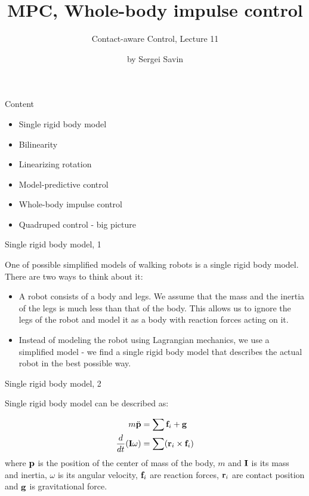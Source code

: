 \documentclass{beamer}
\title{MPC, Whole-body impulse control}
\subtitle{Contact-aware Control, Lecture 11}
\author{by Sergei Savin}
\date{\mydate}
\begin{document}
\maketitle


\begin{frame}{Content}

\begin{itemize}
\item Single rigid body model
\item Bilinearity
\item Linearizing rotation
\item Model-predictive control
\item Whole-body impulse control
\item Quadruped control - big picture
\end{itemize}

\end{frame}




\begin{frame}{Single rigid body model, 1}
	\begin{flushleft}
		
		One of possible simplified models of walking robots is a single rigid body model. There are two ways to think about it:
		
		\begin{itemize}
			\item A robot consists of a body and legs. We assume that the mass and the inertia of the legs is much less than that of the body. This allows us to ignore the legs of the robot and model it as a body with reaction forces acting on it.
			
			\item Instead of modeling the robot using Lagrangian mechanics, we use a simplified model - we find a single rigid body model that describes the actual robot in the best possible way.
		\end{itemize}
		
	\end{flushleft}
\end{frame}



\begin{frame}{Single rigid body model, 2}
	\begin{flushleft}
		
		Single rigid body model can be described as:
		
		\begin{align}
			m \ddot{\mathbf{p}} &= \sum \mathbf{f}_i + \mathbf{g} 
			\\
			\frac{d}{dt}(\mathbf{I}\omega) &= \sum (\mathbf{r}_i \times \mathbf{f}_i)
		\end{align}
		where $\mathbf{p}$ is the position of the center of mass of the body, $m$ and $\mathbf{I}$ is its mass and inertia, $\omega$ is its angular velocity, $\mathbf{f}_i$ are reaction forces, $\mathbf{r}_i$ are contact position and $\mathbf{g}$ is gravitational force.
		
	\end{flushleft}
\end{frame}
\end{document}
